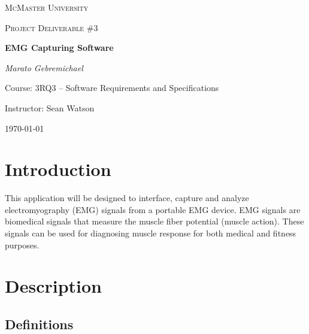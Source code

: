 \documentclass[12pt,a4paper]{article}
\begin{document}
\begin{titlepage}
	\centering
	{\scshape\LARGE McMaster University \par}
	\vspace{2cm}
	{\scshape\Large Project Deliverable \#3 \par}
	\vspace{4cm}
	{\huge\bfseries EMG Capturing Software\par}
	\vspace{2cm}
	{\Large\itshape Marato Gebremichael\par}
	
	\vfill
	Course: 3RQ3 – Software Requirements and Specifications\par
    Instructor: Sean Watson

	\vfill

	{\large \today\par}
\end{titlepage}

\tableofcontents

\newpage

\section{Introduction}

\indent This application will be designed to interface, capture and analyze electromyography (EMG) signals from a portable EMG device. 
EMG signals are biomedical signals that measure the muscle fiber potential (muscle action). 
These signals can be used for diagnosing muscle response for both medical and fitness purposes.

\section{Description}

\subsection{Definitions}
\end{document}
